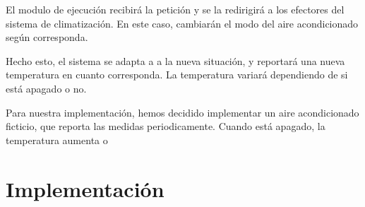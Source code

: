 El modulo de ejecución recibirá la petición y se la redirigirá a los efectores del sistema de climatización. En este caso, cambiarán el modo del aire acondicionado según corresponda.

Hecho esto, el sistema se adapta a a la nueva situación, y reportará una nueva temperatura en cuanto corresponda. La temperatura variará dependiendo de si está apagado o no.

Para nuestra implementación, hemos decidido implementar un aire acondicionado ficticio, que reporta las medidas periodicamente. Cuando está apagado, la temperatura aumenta o

\section{Implementación}
